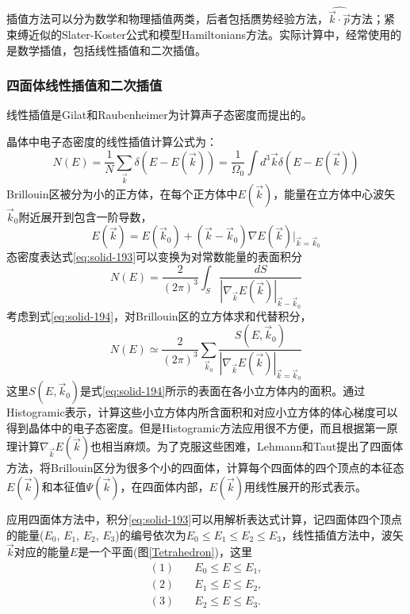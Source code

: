 插值方法可以分为数学和物理插值两类，后者包括赝势经验方法\cite{SSP18-165_1966}，$\widehat{\vec k\cdot\vec p}$方法\cite{Kane,JCP6-367_1938,Seitz,xie-lu}；紧束缚近似的Slater-Koster公式和模型Hamiltonians方法\cite{Nemoshkalenko-Aleshin}。实际计算中，经常使用的是数学插值，包括线性插值\cite{PR144-390_1966,PSSB54-469_1972}和二次插值\cite{PRA139-489_1965,PLA28-570_1969,AP67-15_1971}。

\subsubsection{四面体线性插值和二次插值}\label{Tetrahedron-Quadratic}
线性插值是Gilat和Raubenheimer\cite{PR144-390_1966}为计算声子态密度而提出的。

晶体中电子态密度的线性插值计算公式为：
\begin{equation}
  N(E)=\frac1N\sum_{\vec k}\delta(E-E(\vec k))=\frac1{\Omega_0}\int d^3\vec k\delta(E-E(\vec k)) 
  \label{eq:solid-193}
\end{equation}
Brillouin区被分为小的正方体，在每个正方体中$E(\vec k)$，能量在立方体中心波矢$\vec k_0$附近展开到包含一阶导数，
\begin{equation}
  E(\vec k)=E(\vec k_0)+(\vec k-\vec k_0)\nabla E(\vec k)|_{\vec k=\vec k_0}
  \label{eq:solid-194}
\end{equation}
态密度表达式\eqref{eq:solid-193}可以变换为对常数能量的表面积分
\begin{equation}
  N(E)=\frac2{(2\pi)^3}\int_S\frac{dS}{|\nabla_{\vec k}E(\vec k)|_{\vec k-\vec k_0}}
  \label{eq:solid-195}
\end{equation}
考虑到式\eqref{eq:solid-194}，对Brillouin区的立方体求和代替积分，
\begin{equation}
  N(E)\simeq\frac2{(2\pi)^3}\sum_{\vec k_0}\frac{S(E,\vec k_0)}{|\nabla_{\vec k}E(\vec k)|_{\vec k=\vec k_0}}
  \label{eq:solid-196}
\end{equation}
这里$S(E,\vec k_0)$是式\eqref{eq:solid-194}所示的表面在各小立方体内的面积。通过Histogramic表示，计算这些小立方体内所含面积和对应小立方体的体心梯度可以得到晶体中的电子态密度。但是Histogramic方法应用很不方便，而且根据第一原理计算$\nabla_{\vec k}E(\vec k)$也相当麻烦。为了克服这些困难，Lehmann和Taut提出了四面体方法\cite{PSSB54-469_1972}，将Brillouin区分为很多个小的四面体，计算每个四面体的四个顶点的本征态$E(\vec k)$和本征值$\Psi(\vec k)$，在四面体内部，$E(\vec k)$用线性展开的形式表示。

应用四面体方法中，积分\eqref{eq:solid-193}可以用解析表达式计算，记四面体四个顶点的能量($E_0$, $E_1$, $E_2$, $E_3$)的编号依次为$E_0\leqslant E_1\leqslant E_2\leqslant E_3$，线性插值方法中，波矢$\vec k$对应的能量$E$是一个平面(图\ref{Tetrahedron})，这里
\begin{equation}
  \begin{split}
    (1)\quad&E_0\leqslant E\leqslant E_1,\\
    (2)\quad&E_1\leqslant E\leqslant E_2,\\
    (3)\quad&E_2\leqslant E\leqslant E_3.
  \end{split}
  \label{eq:solid-197}
\end{equation}

